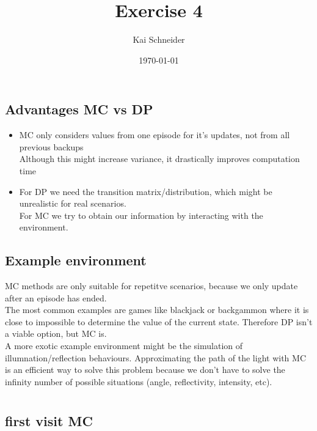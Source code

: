 \documentclass[11pt,a4paper]{article}
\title{Exercise 4}
\author{Kai Schneider}
\date{\today}
\begin{document}
 

\maketitle

\section{}

\subsection{Advantages MC vs DP}

\begin{itemize}
    \item MC only considers values from one episode for it's updates, not from all previous backups\\
    Although this might increase variance, it drastically improves computation time
    \item For DP we need the transition matrix/distribution, which might be unrealistic for real 
    scenarios.\\
    For MC we try to obtain our information by interacting with the environment. 
\end{itemize}

\subsection{Example environment}
MC methods are only suitable for repetitve scenarios, because we only update after an episode has ended.\\
The most common examples are games like blackjack or backgammon where it is close to impossible to 
determine the value of the current state. Therefore DP isn't a viable option, but MC is.\\
A more exotic example environment might be the simulation of illumnation/reflection behaviours. Approximating the
path of the light with MC is an efficient way to solve this problem because we don't have to solve
the infinity number of possible situations (angle, reflectivity, intensity, etc).


\section{}

\subsection{first visit MC}
\end{document}
